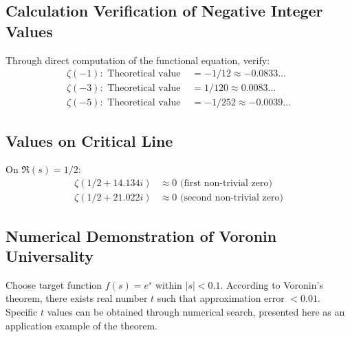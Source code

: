 \documentclass[11pt]{article}
\begin{document}
\subsection{Calculation Verification of Negative Integer Values}

Through direct computation of the functional equation, verify:
\begin{align}
\zeta(-1): \text{ Theoretical value } &= -1/12 \approx -0.0833\ldots \\
\zeta(-3): \text{ Theoretical value } &= 1/120 \approx 0.0083\ldots \\
\zeta(-5): \text{ Theoretical value } &= -1/252 \approx -0.0039\ldots
\end{align}

\subsection{Values on Critical Line}

On $\Re(s) = 1/2$:
\begin{align}
\zeta(1/2 + 14.134i) &\approx 0 \text{ (first non-trivial zero)} \\
\zeta(1/2 + 21.022i) &\approx 0 \text{ (second non-trivial zero)}
\end{align}

\subsection{Numerical Demonstration of Voronin Universality}

Choose target function $f(s) = e^s$ within $|s| < 0.1$. According to Voronin's theorem, there exists real number $t$ such that approximation error $< 0.01$. Specific $t$ values can be obtained through numerical search, presented here as an application example of the theorem.
\end{document}
